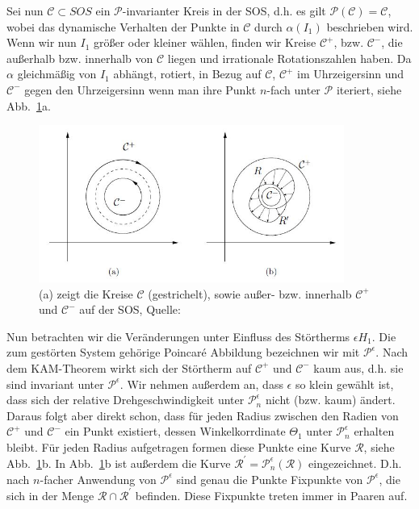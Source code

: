 \documentclass[11pt,a4paper]{article}
\begin{document}
Sei nun $ \mathcal{C} \subset SOS $ ein $ \mathcal{P} $-invarianter Kreis in der SOS, d.h. es gilt $ \mathcal{P}(\mathcal{C})=\mathcal{C} $, wobei das dynamische Verhalten der Punkte in $ \mathcal{C} $ durch $ \alpha(I_1) $ beschrieben wird. Wenn wir nun $ I_1 $ größer oder kleiner wählen, finden wir Kreise $ \mathcal{C^+} $, bzw. $ \mathcal{C^-} $, die außerhalb bzw. innerhalb von $ \mathcal{C} $ liegen und irrationale Rotationszahlen haben.  Da $ \alpha $ gleichmäßig von $ I_1 $ abhängt, rotiert, in Bezug auf $ \mathcal{C} $, $ \mathcal{C^+} $ im Uhrzeigersinn und $ \mathcal{C^-} $ gegen den Uhrzeigersinn wenn man ihre Punkt $ n $-fach unter $ \mathcal{P} $ iteriert, siehe Abb.~\ref{poinbi1}a.
\begin{figure}[h]
\centering
\includegraphics[width=10cm]{poinbi1}
\caption{(a) zeigt die Kreise $ \mathcal{C} $ (gestrichelt), sowie außer- bzw. innerhalb $ \mathcal{C^+} $ und $ \mathcal{C^-} $ auf der SOS, Quelle: \cite{Wim}}
\label{poinbi1}
\end{figure}

Nun betrachten wir die Veränderungen unter Einfluss des Störtherms $ \epsilon H_1 $. Die zum gestörten System gehörige Poincar\'{e} Abbildung bezeichnen wir mit $ \mathcal{P^\epsilon} $. Nach dem KAM-Theorem wirkt sich der Störtherm auf $ \mathcal{C^+} $ und $ \mathcal{C^-} $ kaum aus, d.h. sie sind invariant unter $ \mathcal{P^\epsilon} $. Wir nehmen außerdem an, dass $ \epsilon $ so klein gewählt ist, dass sich der relative Drehgeschwindigkeit unter $ \mathcal{P}^\epsilon_n $ nicht (bzw. kaum) ändert. Daraus folgt aber direkt schon, dass für jeden Radius zwischen den Radien von $ \mathcal{C^+} $ und $ \mathcal{C^-} $ ein Punkt existiert, dessen Winkelkorrdinate $ \Theta_1 $ unter $ \mathcal{P}^\epsilon_n $ erhalten bleibt. Für jeden Radius aufgetragen formen diese Punkte eine Kurve $ \mathcal{R} $, siehe Abb.~\ref{poinbi1}b. In Abb.~\ref{poinbi1}b ist außerdem die Kurve $ \mathcal{R}^{'} = \mathcal{P}^\epsilon_n ( \mathcal{R} )  $ eingezeichnet. D.h. nach $ n $-facher Anwendung von $ \mathcal{P}^\epsilon $ sind genau die Punkte Fixpunkte von $ \mathcal{P}^\epsilon $, die sich in der Menge $ \mathcal{R} \cap \mathcal{R}^' $ befinden. Diese Fixpunkte treten immer in Paaren auf.
\end{document}
